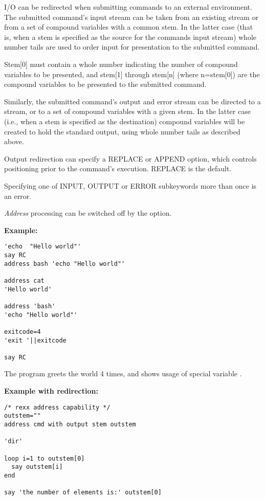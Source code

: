 I/O can be redirected when submitting commands to an external
environment. The submitted command's input stream can be taken from an
existing stream or from a set of compound variables with a common
stem. In the latter case (that is, when a stem is specified as the
source for the commands input stream) whole number tails are used to
order input for presentation to the submitted command.

Stem[0] must contain a whole number indicating the number of compound variables to be presented, and stem[1] through stem[n] (where n=stem[0]) are the compound variables to be presented to the submitted command.

Similarly, the submitted command's output and error stream can be directed to a stream, or to a set of compound variables with a given stem. In the latter case (i.e., when a stem is specified as the destination) compound variables will be created to hold the standard output, using whole number tails as described above. 

Output redirection can specify a REPLACE or APPEND option, which controls positioning prior to the command's execution. REPLACE is the default.

Specifying one of INPUT, OUTPUT or ERROR subkeywords more than once is an error.

\emph{Address} processing can be switched off by the  option.

\textbf{Example:}
\begin{lstlisting}
'echo  "Hello world"'
say RC
address bash 'echo "Hello world"'

address cat
'Hello world'

address 'bash'
'echo "Hello world"'

exitcode=4
'exit '||exitcode
 
say RC
\end{lstlisting}
The program greets the world 4 times, and shows usage of special variable .

\textbf{Example with redirection:}
\begin{lstlisting}
/* rexx address capability */
outstem=""
address cmd with output stem outstem

'dir'

loop i=1 to outstem[0]
  say outstem[i]
end

say 'the number of elements is:' outstem[0]
\end{lstlisting}
